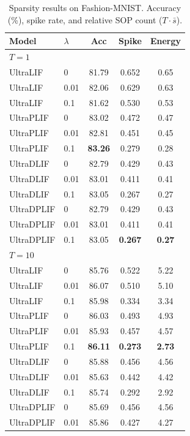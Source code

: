 \documentclass{article}
\theoremstyle{plain}
\theoremstyle{definition}
\theoremstyle{remark}
\begin{document}
\begin{table}[h]
\caption{Sparsity results on Fashion-MNIST. Accuracy (\%), spike rate, and relative SOP count ($T \cdot \bar{s}$).}
\label{tab:sparsity_fashion}
\vskip 0.1in
\begin{center}
\begin{small}
\begin{tabular}{llccc}
\toprule
Model & $\lambda$ & Acc & Spike & Energy \\
\midrule
\multicolumn{5}{l}{\textit{$T{=}1$}} \\
UltraLIF   & 0    & 81.79 & 0.652 & 0.65 \\
UltraLIF   & 0.01 & 82.06 & 0.629 & 0.63 \\
UltraLIF   & 0.1  & 81.62 & 0.530 & 0.53 \\
UltraPLIF  & 0    & 83.02 & 0.472 & 0.47 \\
UltraPLIF  & 0.01 & 82.81 & 0.451 & 0.45 \\
UltraPLIF  & 0.1  & \textbf{83.26} & 0.279 & 0.28 \\
UltraDLIF  & 0    & 82.79 & 0.429 & 0.43 \\
UltraDLIF  & 0.01 & 83.01 & 0.411 & 0.41 \\
UltraDLIF  & 0.1  & 83.05 & 0.267 & 0.27 \\
UltraDPLIF & 0    & 82.79 & 0.429 & 0.43 \\
UltraDPLIF & 0.01 & 83.01 & 0.411 & 0.41 \\
UltraDPLIF & 0.1  & 83.05 & \textbf{0.267} & \textbf{0.27} \\
\midrule
\multicolumn{5}{l}{\textit{$T{=}10$}} \\
UltraLIF   & 0    & 85.76 & 0.522 & 5.22 \\
UltraLIF   & 0.01 & 86.07 & 0.510 & 5.10 \\
UltraLIF   & 0.1  & 85.98 & 0.334 & 3.34 \\
UltraPLIF  & 0    & 86.03 & 0.493 & 4.93 \\
UltraPLIF  & 0.01 & 85.93 & 0.457 & 4.57 \\
UltraPLIF  & 0.1  & \textbf{86.11} & \textbf{0.273} & \textbf{2.73} \\
UltraDLIF  & 0    & 85.88 & 0.456 & 4.56 \\
UltraDLIF  & 0.01 & 85.63 & 0.442 & 4.42 \\
UltraDLIF  & 0.1  & 85.74 & 0.292 & 2.92 \\
UltraDPLIF & 0    & 85.69 & 0.456 & 4.56 \\
UltraDPLIF & 0.01 & 85.86 & 0.427 & 4.27 \\

\end{tabular}
\end{small}
\end{center}
\end{table}
\end{document}
